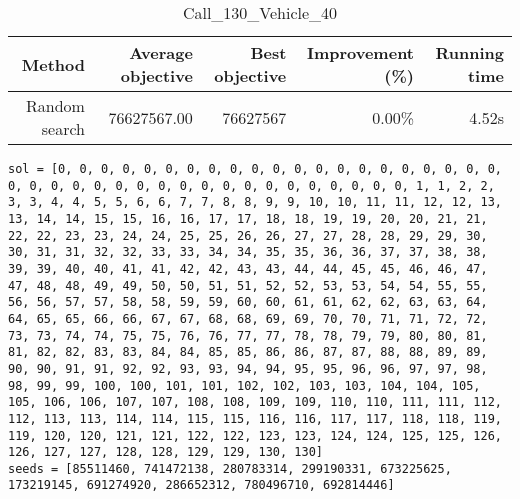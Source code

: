 \begin{table}[ht]
\centering
\caption{Call\_130\_Vehicle\_40}
\label{tab:call130vehicle40}
\begin{tabular}{|r|r|r|r|r|}
Method & Average objective & Best objective & Improvement (\%) & Running time \\
\hline
Random search & 76627567.00 & 76627567 & 0.00\% & 4.52s\\
\end{tabular}%
\end{table}
\begin{lstlisting}[label={lst:call130vehicle40},caption=Optimal solution call\_130\_vehicle\_40]
sol = [0, 0, 0, 0, 0, 0, 0, 0, 0, 0, 0, 0, 0, 0, 0, 0, 0, 0, 0, 0, 0, 0, 0, 0, 0, 0, 0, 0, 0, 0, 0, 0, 0, 0, 0, 0, 0, 0, 0, 0, 1, 1, 2, 2, 3, 3, 4, 4, 5, 5, 6, 6, 7, 7, 8, 8, 9, 9, 10, 10, 11, 11, 12, 12, 13, 13, 14, 14, 15, 15, 16, 16, 17, 17, 18, 18, 19, 19, 20, 20, 21, 21, 22, 22, 23, 23, 24, 24, 25, 25, 26, 26, 27, 27, 28, 28, 29, 29, 30, 30, 31, 31, 32, 32, 33, 33, 34, 34, 35, 35, 36, 36, 37, 37, 38, 38, 39, 39, 40, 40, 41, 41, 42, 42, 43, 43, 44, 44, 45, 45, 46, 46, 47, 47, 48, 48, 49, 49, 50, 50, 51, 51, 52, 52, 53, 53, 54, 54, 55, 55,
56, 56, 57, 57, 58, 58, 59, 59, 60, 60, 61, 61, 62, 62, 63, 63, 64, 64, 65, 65, 66, 66, 67, 67, 68, 68, 69, 69, 70, 70, 71, 71, 72, 72, 73, 73, 74, 74, 75, 75, 76, 76, 77, 77, 78, 78, 79, 79, 80, 80, 81, 81, 82, 82, 83, 83, 84, 84, 85, 85, 86, 86, 87, 87, 88, 88, 89, 89, 90, 90, 91, 91, 92, 92, 93, 93, 94, 94, 95, 95, 96, 96, 97, 97, 98, 98, 99, 99, 100, 100, 101, 101, 102, 102, 103, 103, 104, 104, 105, 105, 106, 106, 107, 107, 108, 108, 109, 109, 110, 110, 111, 111, 112, 112, 113, 113, 114, 114, 115, 115, 116, 116, 117, 117, 118, 118, 119, 119, 120, 120, 121, 121, 122, 122, 123, 123, 124, 124, 125, 125, 126, 126, 127, 127, 128, 128, 129, 129, 130, 130]
seeds = [85511460, 741472138, 280783314, 299190331, 673225625, 173219145, 691274920, 286652312, 780496710, 692814446]
\end{lstlisting}%
\clearpage


